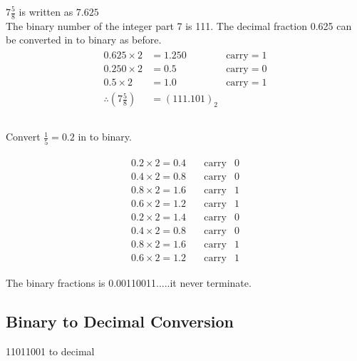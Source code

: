 \begin{answer}
	$7\frac{5}{8}$ is written as $7.625$\\
	The binary number of the integer part 7 is 111. The decimal fraction 0.625 can be converted in to binary as before.\\
	\begin{align*}
	\begin{array}{lll}
	0.625\times2&=1.250&\text{carry}=1\\
	0.250\times2&=0.5&\text{carry}=0\\
	0.5\times2&=1.0&\text{carry}=1\\
	\therefore\left(7\frac{5}{8}\right) &=\left(111.101\right) _2\\
	\end{array}\\
	\end{align*}
\end{answer}

\begin{exercise}
	Convert $\frac{1}{5}=0.2$ in to binary.
\end{exercise}
\begin{answer}
	\begin{align*}
	\begin{array}{lll}
	0.2\times2=0.4&\quad\text{carry}&0\\
	0.4\times2=0.8&\quad\text{carry}&0\\
	0.8\times2=1.6&\quad\text{carry}&1\\
	0.6\times2=1.2&\quad\text{carry}&1\\
	0.2\times2=1.4&\quad\text{carry}&0\\
	0.4\times2=0.8&\quad\text{carry}&0\\
	0.8\times2=1.6&\quad\text{carry}&1\\
	0.6\times2=1.2&\quad\text{carry}&1\\
	\end{array}\\
	\end{align*}
	The binary fractions is 0.00110011.....it never terminate.
\end{answer}
\subsection{Binary to Decimal Conversion}
11011001 to decimal

